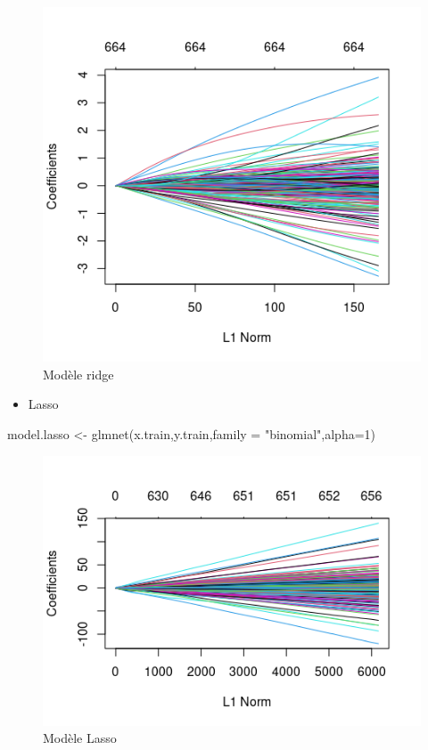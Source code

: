 \documentclass[
  12pt,
]{article}
\newenvironment{Shaded}{\begin{snugshade}}{\end{snugshade}}
\newcommand{\AttributeTok}[1]{\textcolor[rgb]{0.77,0.63,0.00}{#1}}
\newcommand{\DecValTok}[1]{\textcolor[rgb]{0.00,0.00,0.81}{#1}}
\newcommand{\FunctionTok}[1]{\textcolor[rgb]{0.00,0.00,0.00}{#1}}
\newcommand{\NormalTok}[1]{#1}
\newcommand{\OtherTok}[1]{\textcolor[rgb]{0.56,0.35,0.01}{#1}}
\newcommand{\StringTok}[1]{\textcolor[rgb]{0.31,0.60,0.02}{#1}}
\providecommand{\tightlist}{%
  \setlength{\itemsep}{0pt}\setlength{\parskip}{0pt}}
\begin{document}
\begin{figure}

{\centering \includegraphics[width=0.5\linewidth]{pictures/ridge} 

}

\caption{ Modèle ridge}\label{fig:fig_ridge}
\end{figure}

\newpage

\begin{itemize}
\tightlist
\item
  Lasso
\end{itemize}

\begin{Shaded}
\begin{Highlighting}[]
\NormalTok{model.lasso }\OtherTok{\textless{}{-}} \FunctionTok{glmnet}\NormalTok{(x.train,y.train,}\AttributeTok{family =} \StringTok{"binomial"}\NormalTok{,}\AttributeTok{alpha=}\DecValTok{1}\NormalTok{)}
\end{Highlighting}
\end{Shaded}

\begin{figure}

{\centering \includegraphics[width=0.5\linewidth]{pictures/lasso} 

}

\caption{ Modèle Lasso}\label{fig:fig_lasso}
\end{figure}
\end{document}
